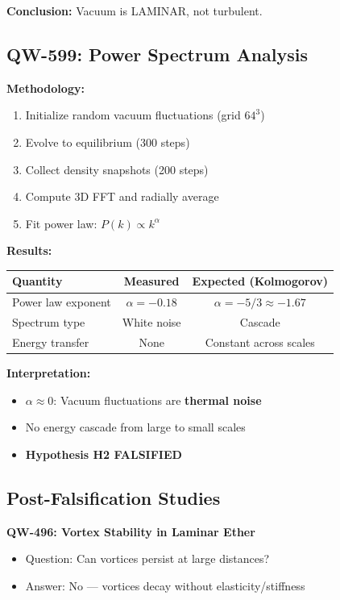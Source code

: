 \documentclass[11pt, a4paper]{article}
\theoremstyle{remark}
\begin{document}
\textbf{Conclusion:} Vacuum is LAMINAR, not turbulent.

\subsection{QW-599: Power Spectrum Analysis}

\textbf{Methodology:}
\begin{enumerate}
    \item Initialize random vacuum fluctuations (grid $64^3$)
    \item Evolve to equilibrium (300 steps)
    \item Collect density snapshots (200 steps)
    \item Compute 3D FFT and radially average
    \item Fit power law: $P(k) \propto k^\alpha$
\end{enumerate}

\textbf{Results:}

\begin{center}
\begin{tabular}{|l|c|c|}
\hline
\textbf{Quantity} & \textbf{Measured} & \textbf{Expected (Kolmogorov)} \\
\hline
Power law exponent & $\alpha = -0.18$ & $\alpha = -5/3 \approx -1.67$ \\
Spectrum type & White noise & Cascade \\
Energy transfer & None & Constant across scales \\
\hline
\end{tabular}
\end{center}

\textbf{Interpretation:}
\begin{itemize}
    \item $\alpha \approx 0$: Vacuum fluctuations are \textbf{thermal noise}
    \item No energy cascade from large to small scales
    \item \textbf{Hypothesis H2 FALSIFIED}
\end{itemize}

\subsection{Post-Falsification Studies}

\textbf{QW-496: Vortex Stability in Laminar Ether}
\begin{itemize}
    \item Question: Can vortices persist at large distances?
    \item Answer: No --- vortices decay without elasticity/stiffness
\end{itemize}
\end{document}
